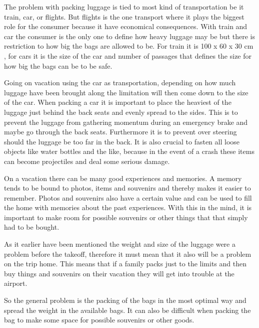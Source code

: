 The problem with packing luggage is tied to most kind of transportation be it train, car, or flights. But flights is the one transport where it plays the biggest role for the consumer because it have economical consequences. With train and car the consumer is the only one to define how heavy luggage may be but there is restriction to how big the bags are allowed to be. For train it is 100 x 60 x 30 cm \citep{rulestrain}, for cars it is the size of the car and number of passages that defines the size for how big the bags can be to be safe.

Going on vacation using the car as transportation, depending on how much luggage have been brought along the limitation will then come down to the size of the car. When packing a car it is important to place the heaviest of the luggage just behind the back seats and evenly spread to the sides. This is to prevent the luggage from gathering momentum during an emergency brake and maybe go through the back seats. Furthermore it is to prevent over steering should the luggage be too far in the back. It is also crucial to fasten all loose objects like water bottles and the like, because in the event of a crash these items can become projectiles and deal some serious damage\citep{Farlig_bagage}.

On a vacation there can be many good experiences and memories. A memory tends to be bound to photos, items and souvenirs and thereby makes it easier to remember. Photos and souvenirs also have a certain value and can be used to fill the home with memories about the past experiences.
With this in the mind, it is important to make room for possible souvenirs or other things that that simply had to be bought.

As it earlier have been mentioned the weight and size of the luggage were a problem before the takeoff, therefore it must mean that it also will be a problem on the trip home.
This means that if a family packs just to the limits and then buy things and souvenirs on their vacation they will get into trouble at the airport.

So the general problem is the packing of the bags in the most optimal way and spread the weight in the available bags. It can also be difficult when packing the bag to make some space for possible souvenirs or other goods.